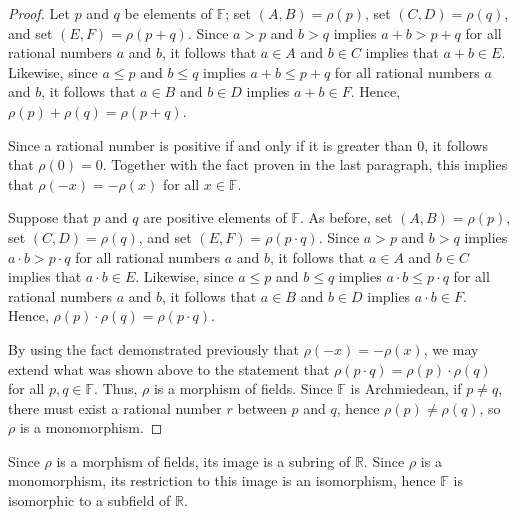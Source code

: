 \documentclass[12pt]{article}
\begin{document}
\begin{proof}
Let $p$ and $q$ be elements of $\mathbb{F}$; set $(A,B) = \rho(p)$, set $(C,D) = 
\rho (q)$, and set $(E,F) = \rho (p+q)$.  Since  $a > p$ and $b > q$ implies $a + b > p + q$ 
for all rational numbers $a$ and $b$, it follows that $a \in A$ and $b \in C$ implies that
$a + b \in E$.  Likewise, since $a \le p$ and $b \le q$ implies $a + b \le p + q$
for all rational numbers $a$ and $b$, it follows that $a \in B$ and $b \in D$ implies
$a + b \in F$.  Hence, $\rho (p) + \rho (q) = \rho (p + q)$.

Since a rational number is positive if and only if it is greater than $0$,  it
follows that $\rho (0) = 0$.  Together with the fact proven in the last paragraph,
this implies that $\rho (-x) = - \rho (x)$ for all $x \in \mathbb{F}$.

Suppose that $p$ and $q$ are positive elements of $\mathbb{F}$.  As before, set 
$(A,B) = \rho(p)$, set $(C,D) = \rho (q)$, and set $(E,F) = \rho (p \cdot q)$.  Since  
$a > p$ and $b > q$ implies $a \cdot b > p \cdot q$ for all rational numbers $a$ 
and $b$, it follows that $a \in A$ and $b \in C$ implies that $a\cdot b \in E$.
Likewise, since $a \le p$ and $b \le q$ implies $a \cdot b \le p \cdot q$
for all rational numbers $a$ and $b$, it follows that $a \in B$ and $b \in D$ implies
$a \cdot b \in F$.  Hence, $\rho (p) \cdot \rho (q) = \rho (p \cdot q)$.

By using the fact demonstrated previously that $\rho (-x) = -\rho (x)$, we may extend
what was shown above to the statement that $\rho (p \cdot q) = \rho (p) \cdot \rho (q)$
for all $p,q \in \mathbb{F}$.  Thus, $\rho$ is a morphism of fields.  Since $\mathbb{F}$ 
is Archmiedean, if $p \neq q$, there must exist a rational number $r$ between $p$ and $q$,
hence $\rho (p) \neq \rho(q)$, so $\rho$ is a monomorphism.
\end{proof}

Since $\rho$ is a morphism of fields, its image is a subring of $\mathbb{R}$.  Since $\rho$
is a monomorphism, its restriction to this image is an isomorphism, hence $\mathbb{F}$ is
isomorphic to a subfield of $\mathbb{R}$.
\end{document}
